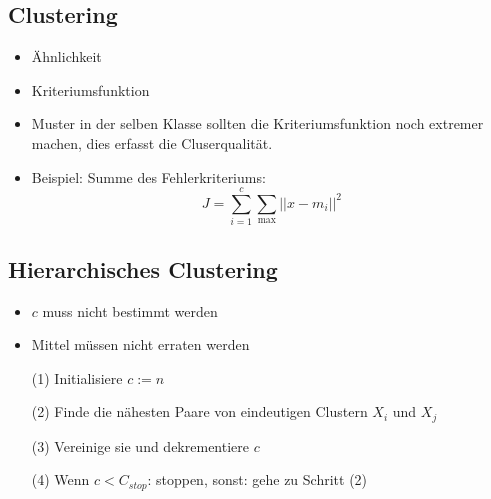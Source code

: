 \subsection{Clustering}

\begin{itemize}
\item Ähnlichkeit
\item Kriteriumsfunktion
\item Muster in der selben Klasse sollten die Kriteriumsfunktion noch extremer machen, dies erfasst die Cluserqualität.
\item Beispiel: Summe des Fehlerkriteriums: $$J = \sum\limits_{i=1}^c \sum\limits_{\max} || x - m_i ||^2$$
\end{itemize}

\subsection{Hierarchisches Clustering}

\begin{itemize}
\item $c$ muss nicht bestimmt werden
\item Mittel müssen nicht erraten werden
\item[(1)] Initialisiere $c := n$
\item[(2)] Finde die nähesten Paare von eindeutigen Clustern $X_i$ und $X_j$
\item[(3)] Vereinige sie und dekrementiere $c$
\item[(4)] Wenn $c < C_{stop}$: stoppen, sonst: gehe zu Schritt (2)
\end{itemize}








